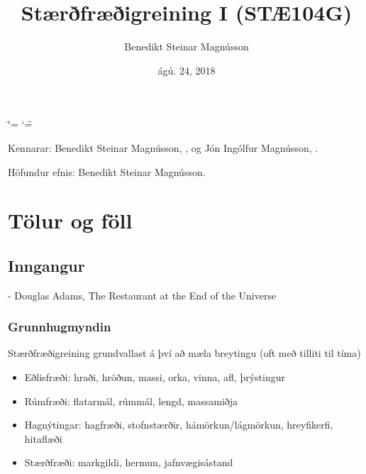 \documentclass[a4paper,10pt,icelandic]{sphinxmanual}
\title{Stærðfræðigreining I (STÆ104G)}
\date{ágú. 24, 2018}
\author{Benedikt Steinar Magnússon}
\begin{document}
\ifdefined\shorthandoff
  \ifnum\catcode`\=\string=\active\shorthandoff{=}\fi
  \ifnum\catcode`\"=\active{}\fi
\fi
\maketitle
\sphinxtableofcontents
{}\label{\detokenize{index::doc}}


Kennarar: Benedikt Steinar Magnússon, , og
Jón Ingólfur Magnússon, .

Höfundur efnis: Benedikt Steinar Magnússon.


\chapter{Tölur og föll}
\label{\detokenize{kafli01:tolur-og-foll}}\label{\detokenize{kafli01::doc}}

\section{Inngangur}
\label{\detokenize{kafli01:inngangur}}

- Douglas Adams, The Restaurant at the End of the Universe


\subsection{Grunnhugmyndin}
\label{\detokenize{kafli01:grunnhugmyndin}}
Stærðfræðigreining grundvallast á því að mæla breytingu (oft með tilliti
til tíma)
\begin{itemize}
\item {} 
Eðlisfræði: hraði, hröðun, massi, orka, vinna, afl, þrýstingur

\item {} 
Rúmfræði: flatarmál, rúmmál, lengd, massamiðja

\item {} 
Hagnýtingar: hagfræði, stofnstærðir, hámörkun/lágmörkun, hreyfikerfi, hitaflæði

\item {} 
Stærðfræði: markgildi, hermun, jafnvægisástand

\end{itemize}
\end{document}
